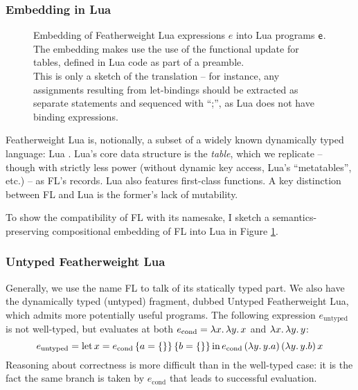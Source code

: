 \subsubsection{Embedding in Lua}

\begin{figure}
    \centering
    
    \caption{Embedding of Featherweight Lua expressions $e$ into Lua programs $\textsf{e}$. The embedding makes use the use of the functional \textsf{update} for tables, defined in Lua code as part of a preamble. \\
    This is only a sketch of the translation -- for instance, any assignments resulting from let-bindings should be extracted as separate statements and sequenced with \enquote{;}, as Lua does not have binding expressions.}
    \label{fig:featherweight-lua-embedding}
\end{figure}

Featherweight Lua is, notionally, a subset of a widely known dynamically typed language: Lua \cite{lua54}.
Lua's core data structure is the \emph{table}, which we replicate -- though with strictly less power (without dynamic key access, Lua's ``metatables'', etc.) -- as FL's records. 
Lua also features first-class functions.
A key distinction between FL and Lua is the former's lack of mutability. 

To show the compatibility of FL with its namesake, I sketch a semantics-preserving compositional embedding of FL into Lua in Figure \ref{fig:featherweight-lua-embedding}.

\subsubsection{Untyped Featherweight Lua}

Generally, we use the name FL to talk of its statically typed part. We also have the dynamically typed (untyped) fragment, dubbed Untyped Featherweight Lua, which admits more potentially useful programs. 
The following expression $e_\mathrm{untyped}$ is not well-typed, but evaluates at both $e_\mathrm{cond} = \lambda {x} \ldotp \lambda {y} \ldotp x$ and $\lambda {x} \ldotp \lambda {y} \ldotp y$:
$$ e_\mathrm{untyped} = \fllet{x}{e_\mathrm{cond}\,\flrec{a=\flrec{}}\,\flrec{b=\flrec{}}} e_\mathrm{cond}\,(\fllam y \flproj{y}{a})\,(\fllam y y{.}b)\,x  $$
Reasoning about correctness is more difficult than in the well-typed case: it is the fact the same branch is taken by $e_\mathrm{cond}$ that leads to successful evaluation.


